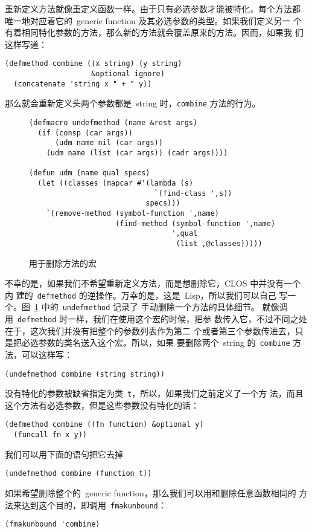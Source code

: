 重新定义方法就像重定义函数一样。由于只有必选参数才能被特化，每个方法都
唯一地对应着它的~generic function 及其必选参数的类型。如果我们定义另一
个有着相同特化参数的方法，那么新的方法就会覆盖原来的方法。因而，如果我
们这样写道：
\begin{lstlisting}
(defmethod combine ((x string) (y string)
                    &optional ignore)
  (concatenate 'string x " + " y))
\end{lstlisting}
那么就会重新定义头两个参数都是~string 时，\verb|combine| 方法的行为。

\begin{figure}
\begin{lstlisting}
(defmacro undefmethod (name &rest args)
  (if (consp (car args))
      (udm name nil (car args))
    (udm name (list (car args)) (cadr args))))

(defun udm (name qual specs)
  (let ((classes (mapcar #'(lambda (s)
                             `(find-class ',s))
                           specs)))
    `(remove-method (symbol-function ',name)
                    (find-method (symbol-function ',name)
                                 ',qual
                                  (list ,@classes)))))
\end{lstlisting}
\caption{\label{fig:macro_for_removing_methods}用于删除方法的宏}
\end{figure}
不幸的是，如果我们不希望重新定义方法，而是想删除它，CLOS 中并没有一个内
建的~\texttt{defmethod} 的逆操作。万幸的是，这是~Lisp，所以我们可以自己
写一个。图~\ref{fig:macro_for_removing_methods} 中的~\texttt{undefmethod} 记录了
手动删除一个方法的具体细节。
就像调用~\texttt{defmethod} 时一样，我们在使用这个宏的时候，把参
数传入它，不过不同之处在于，这次我们并没有把整个的参数列表作为第二
个或者第三个参数传进去，只是把必选参数的类名送入这个宏。所以，如果
要删除两个~string 的~\texttt{combine} 方法，可以这样写：
\begin{lstlisting}
(undefmethod combine (string string))
\end{lstlisting}
没有特化的参数被缺省指定为类~\texttt{t}，所以，如果我们之前定义了一个方
法，而且这个方法有必选参数，但是这些参数没有特化的话：
\begin{lstlisting}
(defmethod combine ((fn function) &optional y)
  (funcall fn x y))
\end{lstlisting}
我们可以用下面的语句把它去掉
\begin{lstlisting}
(undefmethod combine (function t))
\end{lstlisting}
如果希望删除整个的~generic function，那么我们可以用和删除任意函数相同的
方法来达到这个目的，即调用~\texttt{fmakunbound}：
\begin{lstlisting}
(fmakunbound 'combine)
\end{lstlisting}

